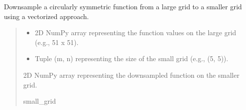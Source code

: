 \documentclass[letterpaper,10pt,english]{sphinxmanual}
\begin{document}
\begin{fulllineitems}
\label{\detokenize{source/stattools:stattools.downsample_circular_function_vectorized}}
\pysigstartsignatures
\pysiglinewithargsret
{}
{\sphinxparamcomma {}}
{}
\pysigstopsignatures
\sphinxAtStartPar
Downsample a circularly symmetric function from a large grid to a smaller grid using a vectorized approach.
\begin{quote}\begin{description}
\begin{itemize}
\item {} 
\sphinxAtStartPar
{} \textendash{} 2D NumPy array representing the function values on the large grid (e.g., 51 x 51).

\item {} 
\sphinxAtStartPar
{} \textendash{} Tuple (m, n) representing the size of the small grid (e.g., (5, 5)).

\end{itemize}

\sphinxAtStartPar
2D NumPy array representing the downsampled function on the smaller grid.

\sphinxAtStartPar
small\_grid

\end{description}\end{quote}

\end{fulllineitems}

\end{document}

